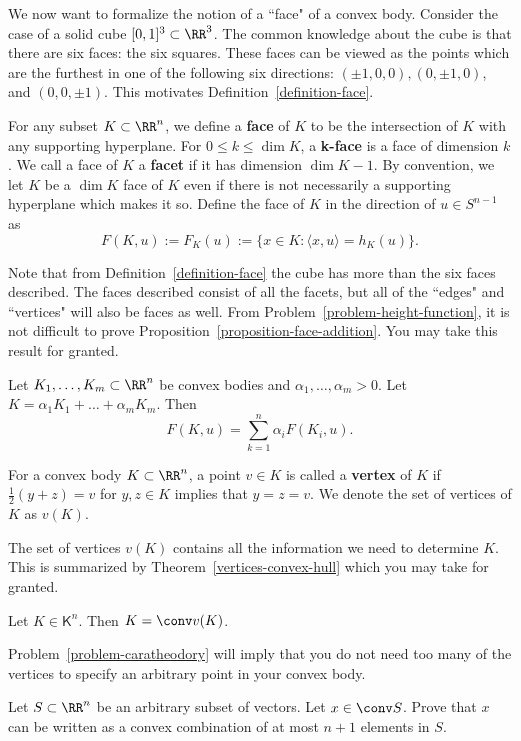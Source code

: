 \documentclass[11pt]{article}
\begin{document}
We now want to formalize the notion of a ``face" of a convex body. Consider the case of a solid cube $[0, 1]^3 \subset \RR^3$. The common knowledge about the cube is that there are six faces: the six squares. These faces can be viewed as the points which are the furthest in one of the following six directions: $(\pm 1, 0, 0), (0, \pm 1, 0)$, and $(0, 0, \pm 1)$. This motivates Definition~\ref{definition-face}.

\begin{defn} \label{definition-face}
    For any subset $K \subset \RR^n$, we define a \textbf{face} of $K$ to be the intersection of $K$ with any supporting hyperplane. For $0 \leq k \leq \dim K$, a \textbf{k-face} is a face of dimension $k$. We call a face of $K$ a \textbf{facet} if it has dimension $\dim K - 1$. By convention, we let $K$ be a $\dim K$ face of $K$ even if there is not necessarily a supporting hyperplane which makes it so. Define the face of $K$ in the direction of $u \in S^{n-1}$ as
    \[
        F(K, u) := F_K(u) := \{ x \in K : \langle x, u \rangle = h_K(u) \}. 
    \]
\end{defn}
 
Note that from Definition~\ref{definition-face} the cube has more than the six faces described. The faces described consist of all the facets, but all of the ``edges" and ``vertices" will also be faces as well. From Problem~\ref{problem-height-function}, it is not difficult to prove Proposition~\ref{proposition-face-addition}. You may take this result for granted. 

\begin{prop} \label{proposition-face-addition}
    Let $K_1, \ldots,  K_m \subset \RR^n$ be convex bodies and $\alpha_1, \ldots, \alpha_m > 0$. Let $K = \alpha_1 K_1 + \ldots + \alpha_m K_m$. Then 
    \[
        F(K, u) = \sum_{k = 1}^n \alpha_i F(K_i, u).  
    \]
\end{prop}

\begin{defn}
    For a convex body $K \subset \RR^n$, a point $v \in K$ is called a \textbf{vertex} of $K$ if $\frac{1}{2}(y + z) = v$ for $y, z \in K$ implies that $y = z = v$. We denote the set of vertices of $K$ as $v(K)$. 
\end{defn}

The set of vertices $v(K)$ contains all the information we need to determine $K$. This is summarized by Theorem~\ref{vertices-convex-hull} which you may take for granted. 
\begin{thm} \label{vertices-convex-hull}
    Let $K \in \mathsf{K}^n$. Then $K = \conv v(K)$. 
\end{thm} 
Problem~\ref{problem-caratheodory} will imply that you do not need too many of the vertices to specify an arbitrary point in your convex body.
\begin{prob} [15 points] \label{problem-caratheodory}
    Let $S \subset \RR^n$ be an arbitrary subset of vectors. Let $x \in \conv S$. Prove that $x$ can be written as a convex combination of at most $n+1$ elements in $S$. 
\end{prob}
\end{document}
